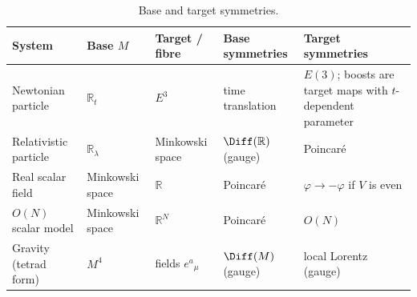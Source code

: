\begin{table}[ht]
\centering
\footnotesize
\renewcommand{\arraystretch}{1.3}
\setlength{\tabcolsep}{3pt}
\begin{tabular}{@{}>{\raggedright\arraybackslash}p{3.0cm}%
                  >{\raggedright\arraybackslash}p{2.1cm}%
                  >{\raggedright\arraybackslash}p{2.4cm}%
                  >{\raggedright\arraybackslash}p{3.0cm}%
                  >{\raggedright\arraybackslash}p{3.6cm}@{}}
\toprule
System & Base $M$ & Target / fibre & Base symmetries & Target symmetries\\
\midrule
Newtonian particle & $\mathbb R_t$ & $E^3$ & time translation
  & $E(3)$; boosts are target maps with $t$-dependent parameter\\
Relativistic particle & $\mathbb R_\lambda$ & Minkowski space
  & $\Diff(\mathbb R)$ (gauge) & Poincar\'e\\
Real scalar field & Minkowski space & $\mathbb R$ & Poincar\'e
  & $\varphi\to-\varphi$ if $V$ is even\\
$O(N)$ scalar model & Minkowski space & $\mathbb R^N$ & Poincar\'e & $O(N)$\\
Gravity (tetrad form) & $M^4$ & fields $e^a{}_\mu$ & $\Diff(M)$ (gauge)
  & local Lorentz (gauge)\\
\bottomrule
\end{tabular}
\caption{Base and target symmetries.}
\label{tab:base-target}
\end{table}

